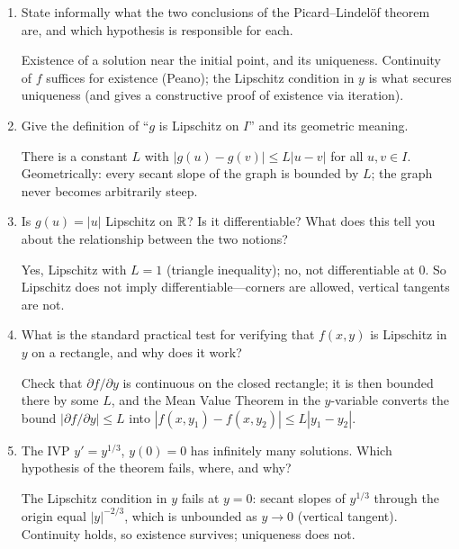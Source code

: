 \documentclass{essay}
\begin{document}
\begin{enumerate}[leftmargin=*, itemsep=8pt]

  \item State informally what the two conclusions of the Picard--Lindel\"of theorem are, and which hypothesis is responsible for each.
  \begin{answer} Existence of a solution near the initial point, and its uniqueness. Continuity of $f$ suffices for existence (Peano); the Lipschitz condition in $y$ is what secures uniqueness (and gives a constructive proof of existence via iteration).\end{answer}

  \item Give the definition of ``$g$ is Lipschitz on $I$'' and its geometric meaning.
  \begin{answer} There is a constant $L$ with $|g(u) - g(v)| \leq L|u-v|$ for all $u, v \in I$. Geometrically: every secant slope of the graph is bounded by $L$; the graph never becomes arbitrarily steep.\end{answer}

  \item Is $g(u) = |u|$ Lipschitz on $\mathbb{R}$? Is it differentiable? What does this tell you about the relationship between the two notions?
  \begin{answer} Yes, Lipschitz with $L = 1$ (triangle inequality); no, not differentiable at $0$. So Lipschitz does not imply differentiable---corners are allowed, vertical tangents are not.\end{answer}

  \item What is the standard practical test for verifying that $f(x,y)$ is Lipschitz in $y$ on a rectangle, and why does it work?
  \begin{answer} Check that $\partial f / \partial y$ is continuous on the closed rectangle; it is then bounded there by some $L$, and the Mean Value Theorem in the $y$-variable converts the bound $|\partial f/\partial y| \leq L$ into $|f(x,y_1) - f(x,y_2)| \leq L|y_1 - y_2|$.\end{answer}

  \item The IVP $y' = y^{1/3}$, $y(0) = 0$ has infinitely many solutions. Which hypothesis of the theorem fails, where, and why?
  \begin{answer} The Lipschitz condition in $y$ fails at $y = 0$: secant slopes of $y^{1/3}$ through the origin equal $|y|^{-2/3}$, which is unbounded as $y \to 0$ (vertical tangent). Continuity holds, so existence survives; uniqueness does not.\end{answer}


\end{enumerate}
\end{document}
